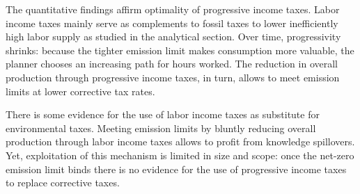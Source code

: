  

  



The quantitative findings affirm optimality of progressive income taxes. 
Labor income taxes mainly serve as complements to fossil taxes to lower inefficiently high labor supply as studied in the analytical section.
Over time, progressivity shrinks: because the tighter emission limit makes consumption more valuable, the planner chooses an increasing path for hours worked. The reduction in overall production through progressive income taxes, in turn, allows to meet emission limits at lower corrective tax rates. 

There is some evidence for the use of labor income taxes as substitute for environmental taxes. Meeting emission limits by bluntly reducing overall production through labor income taxes allows to profit from knowledge spillovers. 
Yet, exploitation of this mechanism is limited in size and scope: once the net-zero emission limit binds there is no evidence for the use of progressive income taxes to replace corrective taxes. %

